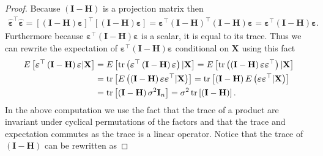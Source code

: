 \begin{proof}
    Because $\left(\mathbf{I} - \mathbf{H}\right)$ is a projection matrix then
    \begin{align*}
        \boldsymbol{\hat{\varepsilon}}^\top\boldsymbol{\hat{\varepsilon}} = \left[  \left(\mathbf{I} - \mathbf{H}\right)\boldsymbol{\varepsilon} \right]^\top\left[ \left(\mathbf{I} - \mathbf{H}\right)\boldsymbol{\varepsilon} \right] = \boldsymbol{\varepsilon}^\top\left(\mathbf{I} - \mathbf{H}\right)^\top \left(\mathbf{I} - \mathbf{H}\right)\boldsymbol{\varepsilon} = \boldsymbol{\varepsilon}^\top \left(\mathbf{I} - \mathbf{H}\right)\boldsymbol{\varepsilon}.
    \end{align*}
    Furthermore because $\boldsymbol{\varepsilon}^\top \left(\mathbf{I} - \mathbf{H}\right)\boldsymbol{\varepsilon}$ is a scalar, it is equal to its trace.
    Thus we can rewrite the expectation of $\boldsymbol{\varepsilon}^\top \left(\mathbf{I} - \mathbf{H}\right)\boldsymbol{\varepsilon}$ conditional on $\mathbf{X}$ using this fact
    \begin{align}
        E\left[\boldsymbol{\varepsilon}^\top \left(\mathbf{I} - \mathbf{H}\right)\boldsymbol{\varepsilon}|\mathbf{X}\right] &= E\left[\operatorname{\text{tr}}\left(\boldsymbol{\varepsilon}^\top \left(\mathbf{I} - \mathbf{H}\right)\boldsymbol{\varepsilon}\right)|\mathbf{X}\right] 
        = E\left[\operatorname{\text{tr}}\left(\left(\mathbf{I} - \mathbf{H}\right)\boldsymbol{\varepsilon}\boldsymbol{\varepsilon}^\top\right)|\mathbf{X}\right] \nonumber\\
        &= \operatorname{\text{tr}}\left[E\left(\left(\mathbf{I} - \mathbf{H}\right)\boldsymbol{\varepsilon}\boldsymbol{\varepsilon}^\top|\mathbf{X}\right)\right] 
        = \operatorname{\text{tr}}\left[\left(\mathbf{I} - \mathbf{H}\right)E\left(\boldsymbol{\varepsilon}\boldsymbol{\varepsilon}^\top|\mathbf{X}\right)\right] \nonumber\\
        &= \operatorname{\text{tr}}\left[\left(\mathbf{I} - \mathbf{H}\right)\sigma^2\mathbf{I}_{n}\right]
        = \sigma^2\operatorname{\text{tr}}\left[\left(\mathbf{I} - \mathbf{H}\right)\right]. \label{eq:trace_projection_matrix}
    \end{align}
    In the above computation we use the fact that the trace of a product are invariant under cyclical permutations of the factors and that the trace and expectation commutes as the trace is a linear operator. 
    Notice that the trace of $\left(\mathbf{I} - \mathbf{H}\right)$ can be rewritten as

\end{proof}
